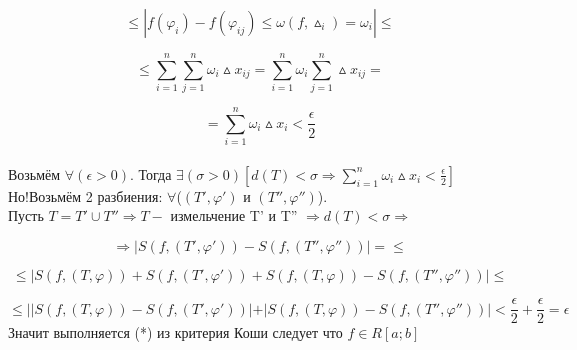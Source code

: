 $$
\leq |f(\varphi_i)-f(\varphi_{ij})\leq\omega(f,\vartriangle_i)=\omega_i|\leq
$$

$$
\leq\sum_{i=1}^{n}\sum_{j=1}^{n}\omega_i\vartriangle x_{ij} = \sum_{i=1}^{n}\omega_i\sum_{j=1}^{n}\vartriangle x_{ij}=
$$

$$
=\sum_{i=1}^{n}\omega_i \vartriangle x_i < \frac{\epsilon}{2}
$$
\\
Возьмём $\forall(\epsilon>0)$. Тогда $\exists(\sigma>0)[d(T)<\sigma\Rightarrow\sum_{i=1}^{n}\omega_i \vartriangle x_i < \frac{\epsilon}{2}]$
\\
Но!Возьмём 2 разбиения: $\forall$($(T',\varphi')$ и $(T'',\varphi'')$).
\\
Пусть $T=T'\cup T'' \Rightarrow T-$ измельчение T' и T'' $\Rightarrow d(T)<\sigma\Rightarrow$

$$
\Rightarrow|S(f,(T',\varphi'))-S(f,(T'',\varphi''))|=\leq
$$

$$
\leq|S(f,(T,\varphi))+S(f,(T',\varphi'))+S(f,(T,\varphi))-S(f,(T'',\varphi''))|\leq
$$

$$
\leq ||S(f,(T,\varphi))-S(f,(T',\varphi'))| + |S(f,(T,\varphi))-S(f,(T'',\varphi''))|<\frac{\epsilon}{2} + \frac{\epsilon}{2} = \epsilon
$$
Значит выполняется (*) из критерия Коши следует что $f\in R[a;b]$
\dokno
